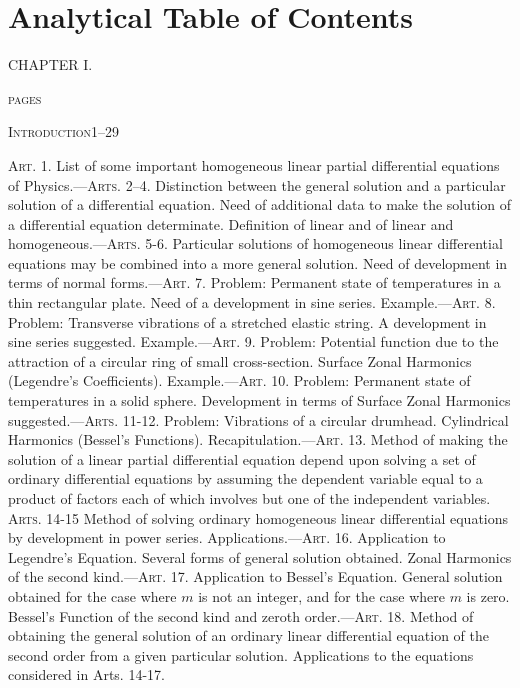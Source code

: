 \documentclass[oneside,12pt]{book}
\begin{document}
\chapter{Analytical Table of Contents}
\begin{center}
    \uppercase{Chapter I.}
\end{center}
\begin{flushright}
    \textsc{pages}
\end{flushright}
\vspace{-0.6cm}
\textsc{Introduction\hfill 1--29} \par 
\textsc{Art. 1.} List of some important homogeneous linear partial differential equations of Physics.---\textsc{Arts. 2--4.} Distinction between the general solution and a particular solution of a differential equation. Need of additional data to make the solution of a differential equation determinate. Definition of linear and of linear and homogeneous.---\textsc{Arts. 5-6.} Particular solutions of homogeneous linear differential equations may be combined into a more general solution. Need of development in terms of normal forms.---\textsc{Art. 7.} Problem: Permanent state of temperatures in a thin rectangular plate. Need of a development in sine series. Example.---\textsc{Art. 8.} Problem: Transverse vibrations of a stretched elastic string. A development in sine series suggested. Example.---\textsc{Art. 9.} Problem: Potential function due to the attraction of a circular ring of small cross-section. Surface Zonal Harmonics (Legendre's Coefficients). Example.---\textsc{Art. 10.} Problem: Permanent state of temperatures in a solid sphere. Development in terms of Surface Zonal Harmonics suggested.---\textsc{Arts. 11-12}. Problem: Vibrations of a circular drumhead. Cylindrical Harmonics (Bessel's Functions). Recapitulation.---\textsc{Art. 13.} Method of making the solution of a linear partial differential equation depend upon solving a set of ordinary differential equations by assuming the dependent variable equal to a product of factors each of which involves but one of the independent variables. \textsc{Arts. 14-15} Method of solving ordinary homogeneous linear differential equations by development in power series. Applications.---\textsc{Art. 16.} Application to Legendre's Equation. Several forms of general solution obtained. Zonal Harmonics of the second kind.---\textsc{Art. 17.} Application to Bessel's Equation. General solution obtained for the case where $m$ is not an integer, and for the case where $m$ is zero. Bessel's Function of the second kind and zeroth order.---\textsc{Art. 18.} Method of obtaining the general solution of an ordinary linear differential equation of the second order from a given particular solution. Applications to the equations considered in Arts. 14-17. \par 
\end{document}
